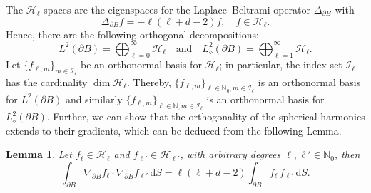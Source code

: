 \documentclass[reqno]{amsart}
\numberwithin{equation}{section}
\numberwithin{figure}{section}
\numberwithin{table}{section}
\theoremstyle{plain}
\newtheorem{lemma}[theorem]{Lemma}
\theoremstyle{definition}
\theoremstyle{remark}
\newcommand{\di}{\mathrm{d}}   %
\newcommand{\N}{\mathbb{N}}
\newcommand{\sphe}{{\partial B}}
\begin{document}
The \( \mathcal{H}_\ell \)-spaces are the eigenspaces for the Laplace–Beltrami operator \( \Delta_{\sphe} \) with
%
\begin{equation} \label{eq:LBeig}
    \Delta_{\sphe} f = -\ell(\ell+d-2)f, \quad f\in\mathcal{H}_\ell.
\end{equation}
%
Hence, there are the following orthogonal decompositions:
%
\begin{equation*}
    L^2(\sphe) = \bigoplus_{\ell=0}^\infty \mathcal{H}_\ell \quad \text{and} \quad L^2_\diamond(\sphe) = \bigoplus_{\ell=1}^\infty \mathcal{H}_\ell.
\end{equation*}
%
Let \( \{f_{\ell,m}\}_{m \in \mathcal{I}_\ell} \) be an orthonormal basis for \( \mathcal{H}_\ell \); in particular, the index set \( \mathcal{I}_\ell \) has the cardinality \( \dim\mathcal{H}_\ell \).
%
Thereby, \( \{f_{\ell,m}\}_{\ell\in\N_0, m \in \mathcal{I_{\ell}}} \) is an orthonormal basis for \( L^2(\sphe) \) and similarly \( \{ f_{\ell,m} \}_{\ell \in \N, m \in \mathcal{I_\ell}} \) is an orthonormal basis for \( L^2_\diamond(\sphe) \).
%
Further, we can show that the orthogonality of the spherical harmonics extends to their gradients, which can be deduced from the following Lemma.
%
\begin{lemma} \label{lemma:gradient}
    Let \( f_{\ell} \in \mathcal{H}_\ell \) and \( f_{\ell'} \in \mathcal{H}_{\ell'} \), with arbitrary degrees \( \ell, \ell' \in \N_0 \), then
    \begin{equation*}
        \int_{\sphe} \nabla_{\sphe} f_{\ell} \cdot \overline{\nabla_{\sphe} f_{\ell'}} \, \di S
   	    =
        \ell (\ell + d - 2) \int_{\sphe} f_{\ell} \, \overline{f_{\ell'}} \, \di S.
    \end{equation*}
\end{lemma}
%
\end{document}
